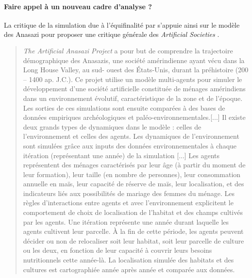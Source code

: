 \paragraph{Faire appel à un nouveau cadre d'analyse ?}
\label{p:cadre_analyse}



La critique de la simulation due à l’équifinalité par \textcite{Yanoff2008}  s’appuie ainsi sur le modèle des Anasazi \autocites{Dean2000, Axtell2002} pour proposer une critique générale des \textit{Artificial Societies} .

\blockquote[{\cite[326-327]{Schmitt2014}}]{\textit{The Artificial Anasazi Project} a pour but de comprendre la trajectoire démographique des Anasazis, une société amérindienne ayant vécu dans la Long House Valley, au sud- ouest des États-Unis, durant la préhistoire (200 – 1400 ap. J.C.). Ce projet utilise un modèle multi-agents pour simuler le développement d’une société artificielle constituée de ménages amérindiens dans un environnement évolutif, caractéristique de la zone et de l’époque. Les sorties de ces simulations sont ensuite comparées à des bases de données empiriques archéologiques et paléo-environnementales.[...] Il existe deux grands types de dynamiques dans le modèle : celles de l’environnement et celles des agents. Les dynamiques de l’environnement sont simulées grâce aux inputs des données environnementales à chaque itération (représentant une année) de la simulation [...] Les agents représentent des ménages caractérisés par leur âge (à partir du moment de leur formation), leur taille (en nombre de personnes), leur consommation annuelle en maïs, leur capacité de réserve de maïs, leur localisation, et des indicateurs liés aux possibilités de mariage des femmes du ménage. Les règles d’interactions entre agents et avec l’environnement explicitent le comportement de choix de localisation de l’habitat et des champs cultivés par les agents. Une itération représente une année durant laquelle les agents cultivent leur parcelle. À la fin de cette période, les agents peuvent décider ou non de relocaliser soit leur habitat, soit leur parcelle de culture ou les deux, en fonction de leur capacité à couvrir leurs besoins nutritionnels cette année-là. La localisation simulée des habitats et des cultures est cartographiée année après année et comparée aux données.}

